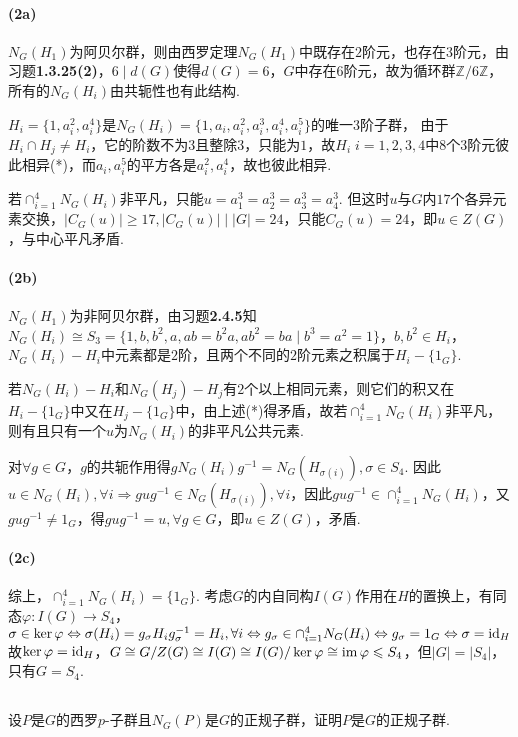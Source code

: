 {	\paragraph{(2a)}
	
	$N_G(H_1)$为阿贝尔群，则由西罗定理$N_G(H_1)$中既存在$2$阶元，也存在$3$阶元，由{\heiti 习题}\textbf{1.3.25(2)}，$6\mid d(G)$使得$d(G)=6$，$G$中存在$6$阶元，故为循环群$\mathbb{Z}/6\mathbb{Z}$，所有的$N_G(H_i)$由共轭性也有此结构.
	
	$H_i=\{1,a_i^2,a_i^4\}$是$N_G(H_i)=\{1,a_i,a_i^2,a_i^3,a_i^4,a_i^5\}$的唯一$3$阶子群，
	由于$H_i\cap H_j\neq H_i$，它的阶数不为$3$且整除$3$，只能为$1$，故$H_i\;i=1,2,3,4$中$8$个$3$阶元彼此相异(*)，而$a_i, a_i^5$的平方各是$a_i^2,a_i^4$，故也彼此相异. 
	
	若$\cap_{i=1}^4N_G(H_i)$非平凡，只能$u=a_1^3=a_2^3=a_3^3=a_4^3$. 但这时$u$与$G$内$17$个各异元素交换，$|C_G(u)|\geq 17, |C_G(u)|\mid |G|=24$，只能$C_G(u)=24$，即$u\in Z(G)$，与中心平凡矛盾.
	 
	 \paragraph{(2b)}
	 
	 $N_G(H_1)$为非阿贝尔群，由{\heiti 习题}\textbf{2.4.5}知$N_G(H_i)\cong S_3=\{1,b,b^2,a,ab=b^2a,ab^2=ba\mid b^3=a^2=1\}$，$b,b^2\in H_i$，$N_G(H_i)-H_i$中元素都是$2$阶，且两个不同的$2$阶元素之积属于$H_i-\{1_G\}$.
	 
	 若$N_G(H_i)-H_i$和$N_G(H_j)-H_j$有$2$个以上相同元素，则它们的积又在$H_i-\{1_G\}$中又在$H_j-\{1_G\}$中，由上述(*)得矛盾，故若$\cap_{i=1}^4N_G(H_i)$非平凡，则有且只有一个$u$为$N_G(H_i)$的非平凡公共元素.
	 
	 对$\forall g\in G$，$g$的共轭作用得$gN_G(H_i)g^{-1}=N_G(H_{\sigma(i)}), \sigma\in S_4$. 因此$u\in N_G(H_i),\forall i\Rightarrow gug^{-1}\in N_G(H_{\sigma(i)}),\forall i$，因此$gug^{-1}\in\cap_{i=1}^4N_G(H_i)$，又$gug^{-1}\neq 1_G$，得$gug^{-1}=u, \forall g\in G$，即$u\in Z(G)$，矛盾.
	 
	 \paragraph{(2c)}
	 综上，$\cap_{i=1}^4N_G(H_i)=\{1_G\}$. 考虑$G$的内自同构$I(G)$作用在$H$的置换上，有同态$\varphi: I(G)\rightarrow S_4$，$\sigma \in \ker\varphi \Leftrightarrow \sigma(H_i)=g_{\sigma}H_ig_{\sigma}^{-1}=H_i,  \forall i\Leftrightarrow g_{\sigma}\in \cap_{i=1}^4N_G(H_i)\Leftrightarrow g_{\sigma}=1_G\Leftrightarrow \sigma=\operatorname{id}_H$
	 故$\ker\varphi=\operatorname{id}_H$，$G\cong G/Z(G)\cong I(G)\cong I(G)/\ker\varphi\cong \operatorname{im}\varphi\leqslant S_4$，但$|G|=|S_4|$，只有$G=S_4$.
}

\subsection{}
设$P$是$G$的西罗$p$-子群且$N_G(P)$是$G$的正规子群，证明$P$是$G$的正规子群.

